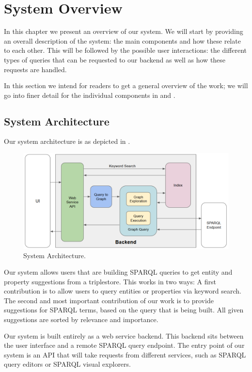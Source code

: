 \chapter{System Overview}
\label{chap:overview}

In this chapter we present an overview of our system. 
We will start by providing an overall description of the system: 
the main components and how these relate to each other. 
This will be followed by the possible user interactions: 
the different types of queries that can be requested to our backend as well as how these requests are handled.

In this section we intend for readers to get a general overview of the work; we will go into finer detail for the individual components in  and .

\section{System Architecture}

Our system architecture is as depicted in .

\begin{figure}[H]
    \centering
        \includegraphics[width=\linewidth]{imagenes/architecture.png}
        \caption{System Architecture.}
        \label{fig:architecture}
\end{figure}

Our system allows users that are building SPARQL queries to get entity and property suggestions from a triplestore. 
This works in two ways: 
A first contribution is to allow users to query entities or properties via keyword search. 
The second and most important contribution of our work is to provide suggestions for SPARQL terms, based on the query that is being built. 
All given suggestions are sorted by relevance and importance.

Our system is built entirely as a web service backend. 
This backend sits between the user interface and a remote SPARQL query endpoint. 
The entry point of our system is an API that will take requests from different services, such as SPARQL query editors or SPARQL visual explorers. 

